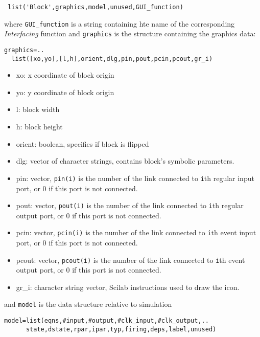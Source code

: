 \documentclass{book}
\newcommand{\interfacing}{{\em Interfacing }}
\begin{document}
\begin{verbatim}
 list('Block',graphics,model,unused,GUI_function)
\end{verbatim}
where {\tt GUI\_function} is a string containing hte name of the
corresponding \interfacing function and
{\tt graphics} is the structure containing the graphics data:
\begin{verbatim}
graphics=..
  list([xo,yo],[l,h],orient,dlg,pin,pout,pcin,pcout,gr_i)
\end{verbatim}
\begin{itemize}
\item xo: x coordinate of block origin
\item yo: y coordinate of block origin
\item l: block width
\item h: block height
\item orient:  boolean, specifies if block is flipped
\item dlg: \label{dlg2} vector of character strings, contains block's
symbolic parameters.

\item pin: vector, {\tt pin(i)} is  the number  of the link
  connected to {\tt i}th regular input port, or 0 if this port is not  connected.
\item pout: vector, {\tt pout(i)} is  the number  of the link
  connected to {\tt i}th regular output port, or 0 if this port is not
  connected.
\item pcin: vector, {\tt pcin(i)} is  the number  of the link
  connected to {\tt i}th event input port, or 0 if this port is not
  connected.
\item pcout: vector, {\tt pcout(i)} is  the number  of the link
  connected to {\tt i}th event output port, or 0 if this port is not
  connected.
\item gr\_i: character string vector, Scilab instructions used to draw
  the icon.
\end{itemize}
and {\tt model} is the data structure relative to simulation 
\label{model}
\begin{verbatim}
model=list(eqns,#input,#output,#clk_input,#clk_output,..
      state,dstate,rpar,ipar,typ,firing,deps,label,unused)
\end{verbatim}
\end{document}
